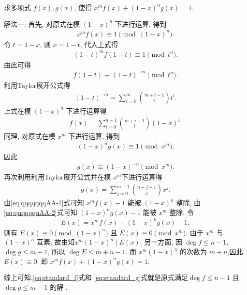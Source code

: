 \documentclass[../../main.tex]{subfiles}%
\begin{document}
\begin{example}
求多项式 \(f(x),g(x)\), 使得 \(x^{m}f(x)+(1-x)^{n}g(x)=1\).
\end{example}
\begin{solution}

{\color{blue}解法一:} 
首先, 对原式在模 \((1-x)^n\) 下进行运算, 得到
\begin{align}\label{eq:qqqqqqqAA-1}
x^{m}f(x)\equiv 1\pmod{(1-x)^n}.
\end{align}
令 \(t=1-x\), 则 \(x=1-t\), 代入上式得
\begin{align*}
(1-t)^{m}f(1-t)\equiv 1\pmod{t^n}.
\end{align*}
由此可得
\begin{align*}
f(1-t)\equiv (1-t)^{-m}\pmod{t^n}.
\end{align*}
利用Taylor展开公式得
\begin{align*}
(1-t)^{-m}=\sum\limits_{i=0}^{\infty}\binom{m+i-1}{i}t^i.
\end{align*}
上式在模 \((1-x)^n\) 下进行运算得
\begin{align}
f(x)=\sum\limits_{i=0}^{n-1}\binom{m+i-1}{i}(1-x)^i. \label{eq:standard_f}
\end{align}
同理, 对原式在模 \(x^m\) 下进行运算, 得到
\begin{align}\label{eq:qqqqqqqAA-2}
(1-x)^n g(x)\equiv 1\pmod{x^m}.
\end{align}
因此
\begin{align*}
g(x)\equiv (1-x)^{-n}\pmod{x^m}.
\end{align*}
再次利用利用Taylor展开公式并在模 \(x^m\)下进行运算得
\begin{align}
g(x)=\sum\limits_{j=0}^{m-1}\binom{n+j-1}{j}x^j. \label{eq:standard_g}
\end{align}
由\eqref{eq:qqqqqqqAA-1}式可知 $x^{m}f(x)-1$ 能被 $(1-x)^{n}$ 整除, 由\eqref{eq:qqqqqqqAA-2}式可知 $(1-x)^{n}g(x)-1$ 能被 $x^{m}$ 整除.
令
\begin{align*}
E(x)=x^{m}f(x)+(1-x)^{n}g(x)-1,
\end{align*}
则有 $E(x)\equiv 0 \pmod{(1-x)^n}$ 且 $E(x)\equiv 0 \pmod{x^m}$.
由于 $x^m$ 与 $(1-x)^n$ 互素, 故由知$x^m(1-x)^n \mid E(x)$.
另一方面, 因 $\deg f \leqslant n-1$, $\deg g \leqslant m-1$, 所以 $\deg E \leqslant m+n-1$.
而 $x^m(1-x)^n$ 的次数为 $m+n$,因此 $E(x) \equiv 0$.
即 $x^{m}f(x)+(1-x)^{n}g(x)=1$.

综上可知,\eqref{eq:standard_f}式和 \eqref{eq:standard_g}式就是原式满足\(\deg f \leqslant n-1\) 且 \(\deg g \leqslant m-1\) 的解 .


\end{solution}
\end{document}

